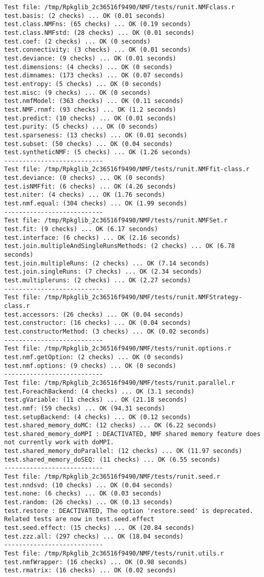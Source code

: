 \documentclass[10pt]{article}\usepackage[]{graphicx}\usepackage[]{color}
\begin{document}
\begin{verbatim}
Test file: /tmp/Rpkglib_2c36516f9490/NMF/tests/runit.NMFclass.r 
test.basis: (2 checks) ... OK (0.01 seconds)
test.class.NMFns: (65 checks) ... OK (0.19 seconds)
test.class.NMFstd: (28 checks) ... OK (0.01 seconds)
test.coef: (2 checks) ... OK (0 seconds)
test.connectivity: (3 checks) ... OK (0.01 seconds)
test.deviance: (9 checks) ... OK (0.01 seconds)
test.dimensions: (4 checks) ... OK (0 seconds)
test.dimnames: (173 checks) ... OK (0.07 seconds)
test.entropy: (5 checks) ... OK (0 seconds)
test.misc: (9 checks) ... OK (0 seconds)
test.nmfModel: (363 checks) ... OK (0.11 seconds)
test.NMF.rnmf: (93 checks) ... OK (1.2 seconds)
test.predict: (10 checks) ... OK (0.01 seconds)
test.purity: (5 checks) ... OK (0 seconds)
test.sparseness: (13 checks) ... OK (0.01 seconds)
test.subset: (50 checks) ... OK (0.04 seconds)
test.syntheticNMF: (5 checks) ... OK (1.26 seconds)
--------------------------- 
Test file: /tmp/Rpkglib_2c36516f9490/NMF/tests/runit.NMFfit-class.r 
test.deviance: (0 checks) ... OK (0 seconds)
test.isNMFfit: (6 checks) ... OK (4.26 seconds)
test.niter: (4 checks) ... OK (1.76 seconds)
test.nmf.equal: (304 checks) ... OK (1.99 seconds)
--------------------------- 
Test file: /tmp/Rpkglib_2c36516f9490/NMF/tests/runit.NMFSet.r 
test.fit: (9 checks) ... OK (6.17 seconds)
test.interface: (6 checks) ... OK (2.16 seconds)
test.join.multipleAndSingleRunsMethods: (2 checks) ... OK (6.78 seconds)
test.join.multipleRuns: (2 checks) ... OK (7.14 seconds)
test.join.singleRuns: (7 checks) ... OK (2.34 seconds)
test.multipleruns: (2 checks) ... OK (2.27 seconds)
--------------------------- 
Test file: /tmp/Rpkglib_2c36516f9490/NMF/tests/runit.NMFStrategy-class.r 
test.accessors: (26 checks) ... OK (0.04 seconds)
test.constructor: (16 checks) ... OK (0.04 seconds)
test.constructorMethod: (3 checks) ... OK (0.02 seconds)
--------------------------- 
Test file: /tmp/Rpkglib_2c36516f9490/NMF/tests/runit.options.r 
test.nmf.getOption: (2 checks) ... OK (0 seconds)
test.nmf.options: (9 checks) ... OK (0 seconds)
--------------------------- 
Test file: /tmp/Rpkglib_2c36516f9490/NMF/tests/runit.parallel.r 
test.ForeachBackend: (4 checks) ... OK (3.1 seconds)
test.gVariable: (11 checks) ... OK (21.18 seconds)
test.nmf: (59 checks) ... OK (94.31 seconds)
test.setupBackend: (4 checks) ... OK (0.12 seconds)
test.shared_memory_doMC: (12 checks) ... OK (6.22 seconds)
test.shared_memory_doMPI : DEACTIVATED, NMF shared memory feature does not currently work with doMPI.
test.shared_memory_doParallel: (12 checks) ... OK (11.97 seconds)
test.shared_memory_doSEQ: (11 checks) ... OK (6.55 seconds)
--------------------------- 
Test file: /tmp/Rpkglib_2c36516f9490/NMF/tests/runit.seed.r 
test.nndsvd: (10 checks) ... OK (0.04 seconds)
test.none: (6 checks) ... OK (0.03 seconds)
test.random: (26 checks) ... OK (0.13 seconds)
test.restore : DEACTIVATED, The option 'restore.seed' is deprecated. Related tests are now in test.seed.effect
test.seed.effect: (15 checks) ... OK (20.84 seconds)
test.zzz.all: (297 checks) ... OK (18.04 seconds)
--------------------------- 
Test file: /tmp/Rpkglib_2c36516f9490/NMF/tests/runit.utils.r 
test.nmfWrapper: (16 checks) ... OK (0.98 seconds)
test.rmatrix: (16 checks) ... OK (0.02 seconds)


\end{verbatim}
\end{document}
